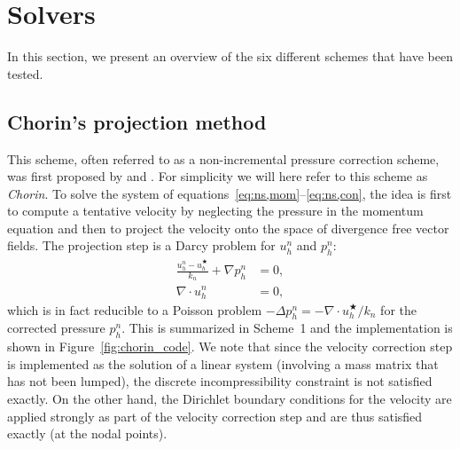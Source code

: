 \section{Solvers}
\label{methods}

In this section, we present an overview of the six different schemes
that have been tested.

\subsection{Chorin's projection method}
\label{sec:chorin}

This scheme, often referred to as a non-incremental pressure
correction scheme, was first proposed by \citet{Chorin1968} and
\citet{Temam1969}. For simplicity we will here refer to this scheme as
\emph{Chorin}. To solve the system of
equations~\eqref{eq:ns,mom}--\eqref{eq:ns,con}, the idea is first to
compute a tentative velocity by neglecting the pressure in the
momentum equation and then to project the velocity onto the space of
divergence free vector fields. The projection step is a Darcy problem
for $u_h^n$ and $p^n_h$:
\begin{align}
  \frac{u_h^n -u_h^{\bigstar}}{k_n} + \nabla p^n_h &= 0, \\
  \nabla \cdot u_h^n &= 0,
\end{align}
which is in fact reducible to a Poisson problem $-\Delta p^n_h =
- \nabla \cdot u_h^{\bigstar} / k_n$ for the corrected pressure
$p^n_h$. This is summarized in Scheme~1 and the implementation is
shown in Figure~\ref{fig:chorin_code}.  We note that since the
velocity correction step is implemented as the solution of a linear
system (involving a mass matrix that has not been lumped), the
discrete incompressibility constraint is not satisfied exactly. On the
other hand, the Dirichlet boundary conditions for the velocity are
applied strongly as part of the velocity correction step and are thus
satisfied exactly (at the nodal points).

